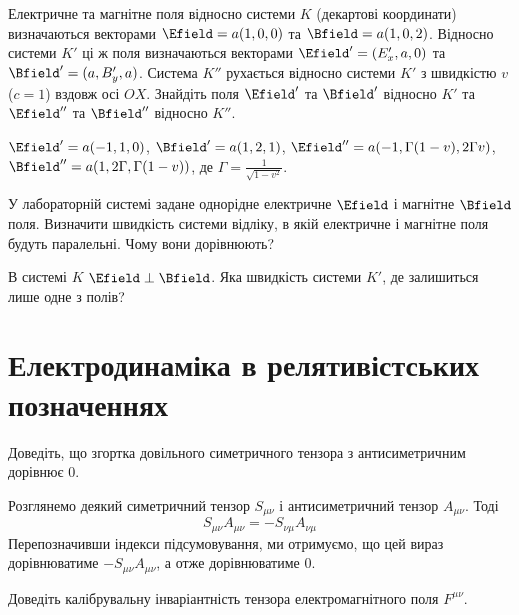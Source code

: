 \begin{problem}
Електричне та магнітне поля відносно системи $K$ (декартові координати) визначаються векторами $\Efield = a(1,0,0)$ та $\Bfield = a(1,0,2)$. Відносно системи $K'$ ці ж поля визначаються векторами $\Efield' = (E_x',a,0)$ та $\Bfield' = (a,B_y',a)$. Система $K''$ рухається відносно системи $K'$ з швидкістю $v$ ($c=1$) вздовж осі $OX$. Знайдіть поля  $\Efield'$ та $\Bfield'$ відносно $K'$ та $\Efield''$ та $\Bfield''$ відносно $K''$.
\begin{solution}
	$\Efield' = a(-1,1,0)$, $\Bfield' = a(1,2,1)$, $\Efield'' = a(-1,\Gamma(1- v),2\Gamma v)$, $\Bfield'' = a(1,2\Gamma,\Gamma(1- v))$, де $\Gamma = \frac{1}{\sqrt{1 - v^2}}$.
\end{solution}
\end{problem}


\begin{problem}
У лабораторній системі задане однорідне електричне $\Efield$ і магнітне $\Bfield$ поля. Визначити швидкість системи відліку, в якій електричне і магнітне поля будуть паралельні. Чому вони дорівнюють?
\end{problem}

\begin{problem}
В системі $K$ $\Efield\perp\Bfield$. Яка швидкість системи $K'$,  де залишиться лише одне з полів?
\end{problem}


\section{Електродинаміка в релятивістських позначеннях}

\begin{problem}
Доведіть, що  згортка довільного симетричного тензора з антисиметричним дорівнює $0$.
\begin{solution}
	Розглянемо деякий симетричний тензор $S_{\mu\nu}$ і антисиметричний тензор $A_{\mu\nu}$. Тоді
	\[
		S_{\mu\nu}A_{\mu\nu} = - S_{\nu\mu}A_{\nu\mu}
	\]
	Перепозначивши індекси підсумовування, ми отримуємо, що цей вираз дорівнюватиме $-S_{\mu\nu}A_{\mu\nu}$, а отже дорівнюватиме $0$.
\end{solution}
\end{problem}

\begin{problem}
Доведіть калібрувальну інваріантність тензора електромагнітного поля $F^{\mu\nu}$.
\end{problem}

